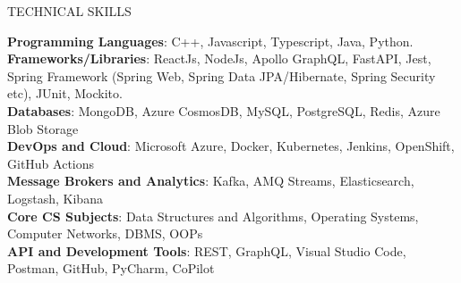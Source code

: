 \documentclass{resume} %
\newcommand\invisible[1]{\textcolor{white}{\fontsize{0}{0}#1}}
\begin{document}
\begin{rSection}{TECHNICAL SKILLS}




\textbf{Programming Languages}: {\normalfont C++, Javascript, Typescript, Java, Python.}
\\
\textbf{Frameworks/Libraries}: {\normalfont ReactJs, NodeJs, Apollo GraphQL, FastAPI, Jest, Spring Framework (Spring Web, Spring Data JPA/Hibernate, Spring Security etc), JUnit, Mockito.}
 \\
 \textbf{Databases}: {\normalfont MongoDB, Azure CosmosDB, MySQL, PostgreSQL, Redis, Azure Blob Storage}
 \\
 \textbf{DevOps and Cloud}: {\normalfont Microsoft Azure, Docker, Kubernetes, Jenkins, OpenShift, GitHub Actions}
 \\
 \textbf{Message Brokers and Analytics}: {\normalfont Kafka, AMQ Streams, Elasticsearch, Logstash, Kibana}  
\\ \textbf{Core CS Subjects}: {\normalfont Data Structures and Algorithms, Operating Systems, Computer Networks, DBMS, OOPs}\\
\textbf{API and Development Tools}: {\normalfont REST, GraphQL, Visual Studio Code, Postman, GitHub, PyCharm, CoPilot}
\end{rSection}









\end{document}
